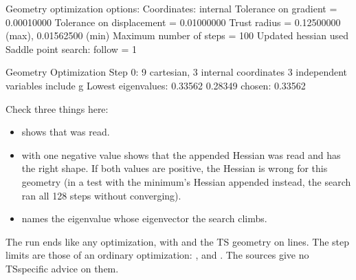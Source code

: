 \documentclass[letterpaper,10pt,english,openany,oneside]{sphinxmanual}
\begin{document}
\begin{sphinxVerbatim}[commandchars=\\\{\}]
 Geometry optimization options:
 Coordinates: internal
 Tolerance on gradient       = 0.00010000
 Tolerance on displacement   = 0.01000000
 Trust radius                = 0.12500000 (max), 0.01562500 (min)
 Maximum number of steps     =        100
 Updated hessian used
 Saddle point search: follow = 1

 Geometry Optimization Step 0:
     9 cartesian,    3 internal coordinates
     3 independent variables
 include g
 Lowest eigenvalues: \PYGZhy{}0.33562  0.28349
 chosen: \PYGZhy{}0.33562
\end{sphinxVerbatim}



\sphinxAtStartPar
Check three things here:
\begin{itemize}
\item {} 
\sphinxAtStartPar
{} shows that  was read.

\item {} 
\sphinxAtStartPar
{} with one negative value shows that the appended Hessian was read and has the right shape.
If both values are positive, the Hessian is wrong for this geometry (in a test with the minimum’s Hessian
appended instead, the search ran all 128 steps without converging).

\item {} 
\sphinxAtStartPar
{} names the eigenvalue whose eigenvector the search climbs.

\end{itemize}



\sphinxAtStartPar
The run ends like any optimization, with  and the TS geometry on  lines.
The step limits are those of an ordinary optimization: {\hyperref[\detokenize{reference/optimize:optimize-trust}]{}},
{\hyperref[\detokenize{reference/optimize:optimize-steps}]{}} and {\hyperref[\detokenize{reference/optimize:optimize-tolerance}]{}}. The sources give no TS\sphinxhyphen{}specific advice on
them.
\end{document}
